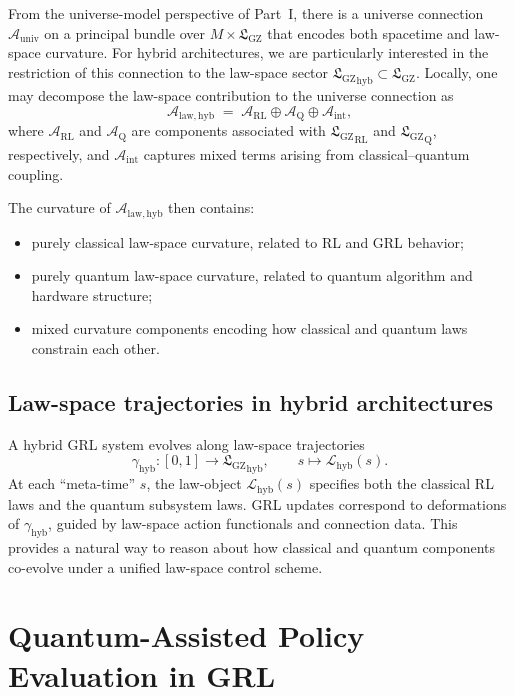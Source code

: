 \documentclass[11pt]{book}
\newcommand{\GZLS}{\ensuremath{\mathfrak{L}_{\mathrm{GZ}}}}
\newcommand{\Base}{\ensuremath{M}}
\theoremstyle{plain}
\theoremstyle{definition}
\theoremstyle{remark}
\begin{document}
From the universe-model perspective of Part~I, there is a universe
connection $\mathcal{A}_{\mathrm{univ}}$ on a principal bundle over
$\Base \times \GZLS$ that encodes both spacetime and law-space
curvature. For hybrid architectures, we are particularly interested
in the restriction of this connection to the law-space sector
${\GZLS}_{\mathrm{hyb}} \subset \GZLS$. Locally, one may decompose
the law-space contribution to the universe connection as
\[
   \mathcal{A}_{\mathrm{law,hyb}}
   \;=\;
   \mathcal{A}_{\mathrm{RL}} \oplus \mathcal{A}_{\mathrm{Q}} \oplus
   \mathcal{A}_{\mathrm{int}},
\]
where $\mathcal{A}_{\mathrm{RL}}$ and $\mathcal{A}_{\mathrm{Q}}$
are components associated with ${\GZLS}_{\mathrm{RL}}$ and
${\GZLS}_{\mathrm{Q}}$, respectively, and $\mathcal{A}_{\mathrm{int}}$
captures mixed terms arising from classical–quantum coupling.

The curvature of $\mathcal{A}_{\mathrm{law,hyb}}$ then contains:
\begin{itemize}
  \item purely classical law-space curvature, related to RL and GRL
        behavior;
  \item purely quantum law-space curvature, related to quantum
        algorithm and hardware structure;
  \item mixed curvature components encoding how classical and
        quantum laws constrain each other.
\end{itemize}

\subsection*{Law-space trajectories in hybrid architectures}

A hybrid GRL system evolves along law-space trajectories
\[
   \gamma_{\mathrm{hyb}} \colon [0,1]
   \longrightarrow {\GZLS}_{\mathrm{hyb}},
   \qquad
   s \longmapsto \mathcal{L}_{\mathrm{hyb}}(s).
\]
At each ``meta-time'' $s$, the law-object
$\mathcal{L}_{\mathrm{hyb}}(s)$ specifies both the classical RL
laws and the quantum subsystem laws. GRL updates correspond to
deformations of $\gamma_{\mathrm{hyb}}$, guided by law-space action
functionals and connection data. This provides a natural way to
reason about how classical and quantum components co-evolve under
a unified law-space control scheme.

\section{Quantum-Assisted Policy Evaluation in GRL}
\label{sec:quantum-assisted-policy-eval}
\end{document}
